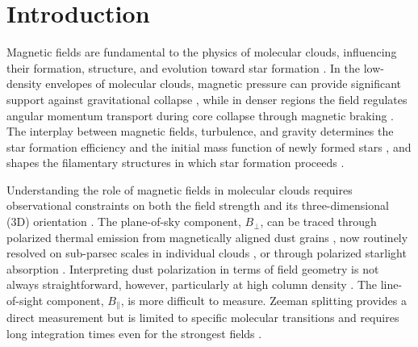 \documentclass[twocolumn]{aastex701}
\begin{document}

\section{Introduction}
\label{sec:intro}

Magnetic fields are fundamental to the physics of molecular clouds,
influencing their formation, structure, and evolution toward star formation
\citep{mckee2007,crutcher2012magnetic,hennebelle2019role,pattle2023,liu2022magnetic}.
In the low-density envelopes of molecular clouds, magnetic pressure can
provide significant support against gravitational collapse
\citep{mouschovias1976nonhomologous}, while in denser regions the field
regulates angular momentum transport during core collapse through magnetic
braking \citep{pudritz2019}. The interplay between magnetic fields,
turbulence, and gravity determines the star formation efficiency and the
initial mass function of newly formed stars
\citep{krumholz2019,federrath2015inefficient}, and shapes the filamentary
structures in which star formation proceeds
\citep{hartmann2001rapid,li2014link,suin2025role}.

Understanding the role of magnetic fields in molecular clouds requires
observational constraints on both the field strength and its
three-dimensional (3D) orientation \citep{tahani2022three}. The plane-of-sky
component, $B_\perp$, can be traced through polarized thermal emission from
magnetically aligned dust grains
\citep{andersson2015interstellar,planck2016,ade2016planck,soler2019using},
now routinely resolved on sub-parsec scales in individual clouds
\citep{tahani2023jcmt,hwang2025jcmt}, or through polarized starlight
absorption \citep{heiles20009286}. Interpreting dust polarization in terms of
field geometry is not always straightforward, however, particularly at high
column density \citep{valdivia2022mm,le2020statistical}. The line-of-sight component, $B_\parallel$, is more difficult to measure.
Zeeman splitting provides a direct measurement but is limited to specific
molecular transitions and requires long integration times even for the
strongest fields
\citep{crutcher1999detection,crutcher2010magnetic,crutcher2019review}.
\end{document}
